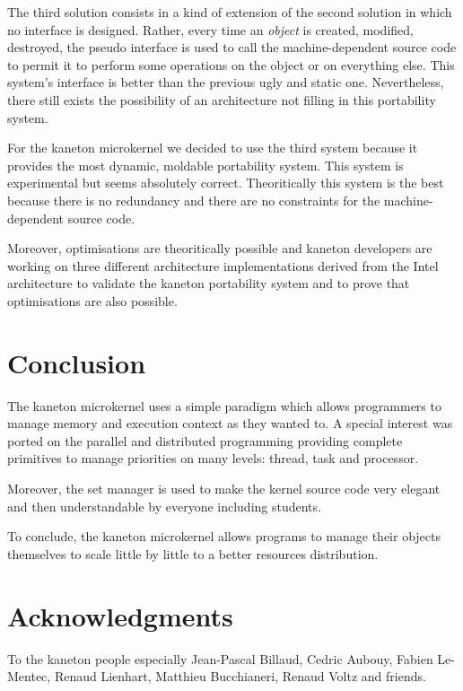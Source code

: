 \begin{multicols}{2}
The third solution consists in a kind of extension of the second solution
in which no interface is designed. Rather, every time an \textit{object} is
created, modified, destroyed, the pseudo interface is used to call the
machine-dependent source code to permit it to perform some operations
on the object or on everything else. This system's interface is better
than the previous ugly and static one. Nevertheless, there still exists the
possibility of an architecture not filling in this portability system.

For the kaneton microkernel we decided to use the third system because
it provides the most dynamic, moldable portability system. This system is
experimental but seems absolutely correct. Theoritically this system
is the best because there is no redundancy and there are no constraints
for the machine-dependent source code.

Moreover, optimisations are theoritically possible and kaneton developers
are working on three different architecture implementations derived from
the Intel architecture to validate the kaneton portability system and to
prove that optimisations are also possible.

%
%

\section{Conclusion}

The kaneton microkernel uses a simple paradigm which allows programmers to
manage memory and execution context as they wanted to. A special interest
was ported on the parallel and distributed programming providing complete
primitives to manage priorities on many levels: thread, task and processor.

Moreover, the set manager is used to make the kernel source code very elegant
and then understandable by everyone including students.

To conclude, the kaneton microkernel allows programs to manage their objects
themselves to scale little by little to a better resources distribution.

%
%

\section{Acknowledgments}

To the kaneton people especially Jean-Pascal Billaud, Cedric Aubouy,
Fabien Le-Mentec, Renaud Lienhart, Matthieu Bucchianeri, Renaud Voltz
and friends.

\end{multicols}


